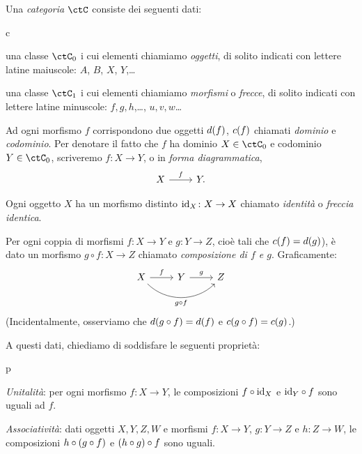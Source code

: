 \begin{definition}[Categoria]\label{def_categ}
	Una \emph{categoria} \(\ctC\) consiste dei seguenti dati:
	\begin{enumtag}{c}
		\item\label{c_1} una classe \(\ctC_0\) i cui elementi chiamiamo \emph{oggetti}, di solito indicati con lettere latine maiuscole: \(A\), \(B\), \(X\), \(Y\),\dots
		\item\label{c_2} una classe \(\ctC_1\) i cui elementi chiamiamo \emph{morfismi} o \emph{frecce}, di solito indicati con lettere latine minuscole: \(f,g,h\),\dots, \(u,v,w\)\dots
		\item\label{c_3} Ad ogni morfismo \(f\) corrispondono due oggetti \(d(f)\), \(c(f)\) chiamati \emph{dominio} e \emph{codominio}. Per denotare il fatto che \(f\) ha dominio \(X\in\ctC_0\) e codominio \(Y\in\ctC_0\), scriveremo \(f\colon X\to Y\), o in \emph{forma diagrammatica},
		\[\begin{tikzcd} X \ar[r, "f"] & Y. \end{tikzcd}\]
		\item\label{c_4} Ogni oggetto \(X\) ha un morfismo distinto \(\mathrm{id}_X\colon X\to X\) chiamato \emph{identità} o \emph{freccia identica}.
		\item\label{c_5} Per ogni coppia di morfismi \(f\colon X\to Y\) e \(g\colon Y\to Z\), cioè tali che \(c(f)=d(g)\)), è dato un morfismo \(g\circ f:X\to Z\) chiamato \emph{composizione di \(f\) e \(g\)}. Graficamente:
		\[
			\begin{tikzcd}
				X \ar{r}{f}
				\ar[rounded corners,out=-45, in=225]{rr}[swap]{g\cmp f}
				& Y \ar{r}{g} & Z \\
				&&
			\end{tikzcd}
		\]
		(Incidentalmente, osserviamo che \(d(g\circ f)=d(f)\) e \(c(g\circ f)=c(g)\).)
	\end{enumtag}
	A questi dati, chiediamo di soddisfare le seguenti proprietà:
	\begin{enumtag}{p}
		\item \label{p_1} \emph{Unitalità}: per ogni morfismo \(f:X\to Y\), le composizioni \(f\circ\mathrm{id}_X\) e \(\mathrm{id}_Y\circ f\) sono uguali ad \(f\).
		\item \label{p_2} \emph{Associatività}: dati oggetti \(X,Y,Z,W\) e morfismi \(f:X\to Y\), \(g:Y\to Z\) e \(h:Z\to W\), le composizioni \(h\circ (g\circ f)\) e \((h\circ g)\circ f\) sono uguali.
	\end{enumtag}
\end{definition}
